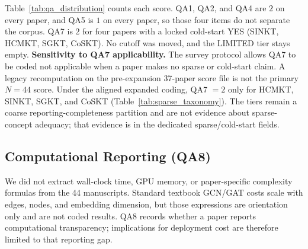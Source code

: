 \documentclass[lettersize,journal]{IEEEtran}
\begin{document}
Table~\ref{tab:qa_distribution} counts each score. QA1, QA2, and QA4 are $2$ on every paper, and QA5 is $1$ on every paper, so those four items do not separate the corpus. QA7 is $2$ for four papers with a locked cold-start YES (SINKT, HCMKT, SGKT, CoSKT). No cutoff was moved, and the LIMITED tier stays empty.
\textbf{Sensitivity to QA7 applicability.} The survey protocol allows QA7 to be coded not applicable when a paper makes no sparse or cold-start claim. A legacy recomputation on the pre-expansion 37-paper score file is not the primary $N=44$ score. Under the aligned expanded coding, QA7 $=2$ only for HCMKT, SINKT, SGKT, and CoSKT (Table~\ref{tab:sparse_taxonomy}). The tiers remain a coarse reporting-completeness partition and are not evidence about sparse-concept adequacy; that evidence is in the dedicated sparse/cold-start fields.

\subsection{Computational Reporting (QA8)}
We did not extract wall-clock time, GPU memory, or paper-specific complexity formulas from the 44 manuscripts. Standard textbook GCN/GAT costs scale with edges, nodes, and embedding dimension, but those expressions are orientation only and are not coded results. QA8 records whether a paper reports computational transparency; implications for deployment cost are therefore limited to that reporting gap.
\end{document}
